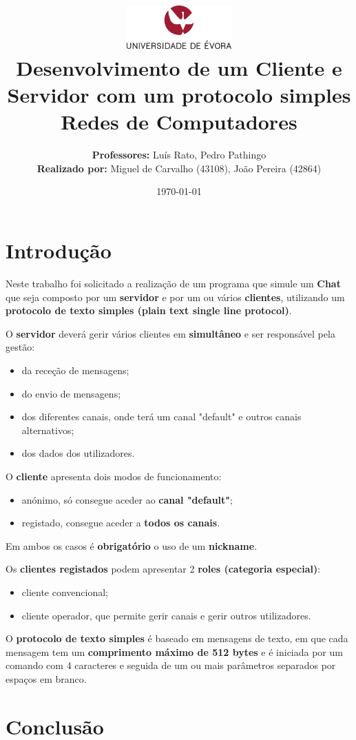 \documentclass[11pt]{article}   %
\title
{
    \includegraphics[width=0.3\textwidth]{images/logo_universidade.png}
    \\[0.1cm]
    \textbf{Desenvolvimento de um Cliente e Servidor com um protocolo simples} \\
    Redes de Computadores
}
\author
{
    \textbf{Professores:} Luís Rato, Pedro Pathingo \\
    \textbf{Realizado por:} Miguel de Carvalho (43108), João Pereira (42864) 
}
\date{\today}
\begin{document}
\maketitle

\section{Introdução} 

\hspace{0,5cm}Neste trabalho foi solicitado a realização de um programa que simule um \textbf{Chat} 
que seja composto por um \textbf{servidor} e por um ou vários \textbf{clientes}, utilizando um 
\textbf{protocolo de texto simples (plain text single line protocol)}.

O \textbf{servidor} deverá gerir vários clientes em \textbf{simultâneo} e ser responsável pela gestão:
\begin{itemize}
    \item da receção de mensagens;
    \item do envio de mensagens;
    \item dos diferentes canais, onde terá um canal "default" e outros canais alternativos;
    \item dos dados dos utilizadores.
\end{itemize}

O \textbf{cliente} apresenta dois modos de funcionamento:
\begin{itemize}
    \item anónimo, só consegue aceder ao \textbf{canal "default"};
    \item registado, consegue aceder a \textbf{todos os canais}.
\end{itemize}
\hspace{0,5cm}Em ambos os casos é \textbf{obrigatório} o uso de um \textbf{nickname}.

Os \textbf{clientes registados} podem apresentar 2 \textbf{roles (categoria especial)}:
\begin{itemize}
    \item cliente convencional;
    \item cliente operador, que permite gerir canais e gerir outros utilizadores.
\end{itemize}

O \textbf{protocolo de texto simples} é baseado em mensagens de texto, em que cada mensagem
tem um \textbf{comprimento máximo de 512 bytes} e é iniciada por um comando com 4 caracteres
e seguida de um ou mais parâmetros separados por espaços em branco.


\section{Conclusão} %


\end{document}
